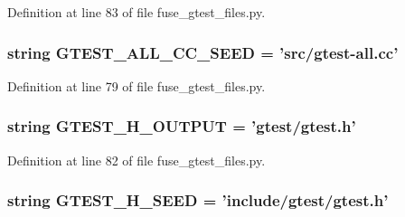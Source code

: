 \-Definition at line 83 of file fuse\-\_\-gtest\-\_\-files.\-py.

\hypertarget{namespacefuse__gtest__files_acaf70978b4d299f368bb6ef035cf3588}{
\subsubsection[{\-G\-T\-E\-S\-T\-\_\-\-A\-L\-L\-\_\-\-C\-C\-\_\-\-S\-E\-E\-D}]{\setlength{\rightskip}{0pt plus 5cm}string {\bf \-G\-T\-E\-S\-T\-\_\-\-A\-L\-L\-\_\-\-C\-C\-\_\-\-S\-E\-E\-D} = 'src/gtest-\/all.\-cc'}}\label{d3/dfa/namespacefuse__gtest__files_acaf70978b4d299f368bb6ef035cf3588}


\-Definition at line 79 of file fuse\-\_\-gtest\-\_\-files.\-py.

\hypertarget{namespacefuse__gtest__files_aa0130025e290eed788baf38584dfd721}{
\subsubsection[{\-G\-T\-E\-S\-T\-\_\-\-H\-\_\-\-O\-U\-T\-P\-U\-T}]{\setlength{\rightskip}{0pt plus 5cm}string {\bf \-G\-T\-E\-S\-T\-\_\-\-H\-\_\-\-O\-U\-T\-P\-U\-T} = 'gtest/gtest.\-h'}}\label{d3/dfa/namespacefuse__gtest__files_aa0130025e290eed788baf38584dfd721}


\-Definition at line 82 of file fuse\-\_\-gtest\-\_\-files.\-py.

\hypertarget{namespacefuse__gtest__files_a90f22503a30c2832ce04ebe8a53bc6eb}{
\subsubsection[{\-G\-T\-E\-S\-T\-\_\-\-H\-\_\-\-S\-E\-E\-D}]{\setlength{\rightskip}{0pt plus 5cm}string {\bf \-G\-T\-E\-S\-T\-\_\-\-H\-\_\-\-S\-E\-E\-D} = 'include/gtest/gtest.\-h'}}\label{d3/dfa/namespacefuse__gtest__files_a90f22503a30c2832ce04ebe8a53bc6eb}


